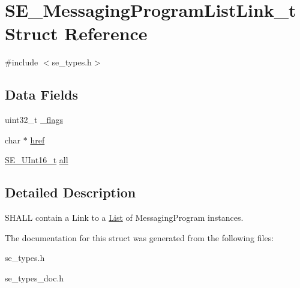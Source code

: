 \hypertarget{structSE__MessagingProgramListLink__t}{}\section{S\+E\+\_\+\+Messaging\+Program\+List\+Link\+\_\+t Struct Reference}
\label{structSE__MessagingProgramListLink__t}


{\ttfamily \#include $<$se\+\_\+types.\+h$>$}

\subsection*{Data Fields}
\begin{DoxyCompactItemize}
\item 
uint32\+\_\+t \hyperlink{group__MessagingProgramListLink_gacaf8f61da354e26c709cf070f085c9ac}{\+\_\+flags}
\item 
char $\ast$ \hyperlink{group__MessagingProgramListLink_ga9de2a5b8c7445491974f50c066dd63ee}{href}
\item 
\hyperlink{group__UInt16_gac68d541f189538bfd30cfaa712d20d29}{S\+E\+\_\+\+U\+Int16\+\_\+t} \hyperlink{group__MessagingProgramListLink_ga6995e02d8ec9a63b3ead9a04addff2d9}{all}
\end{DoxyCompactItemize}


\subsection{Detailed Description}
S\+H\+A\+LL contain a Link to a \hyperlink{structList}{List} of Messaging\+Program instances. 

The documentation for this struct was generated from the following files\+:\begin{DoxyCompactItemize}
\item 
se\+\_\+types.\+h\item 
se\+\_\+types\+\_\+doc.\+h\end{DoxyCompactItemize}

